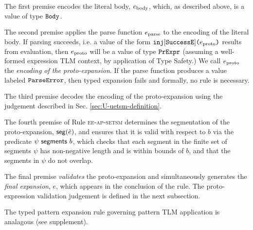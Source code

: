 \documentclass[acmsmall,review,anonymous]{acmart}\settopmatter{printfolios=true,printccs=false,printacmref=false}
\begin{document}
The first premise encodes the literal body, $e_\text{body}$, which, as described above, is a value of type $\mathtt{Body}$.

The second premise applies the parse function $e_\text{parse}$ to the encoding of the literal body. If parsing succeeds, i.e. a value of the form $\texttt{inj}[\mathtt{SuccessE}]\texttt{(}e_\text{proto}\texttt{)}$ results from evaluation, then $e_\text{proto}$ will be a value of type $\mathtt{PrExpr}$ (assuming a well-formed expression TLM context, by application of Type Safety.) We call $e_\text{proto}$ the \emph{encoding of the proto-expansion}. If the parse function produces a value labeled $\mathtt{ParseError}$, then typed expansion fails and formally, no rule is necessary.

The third premise decodes the encoding of the proto-expansion using the judgement described in Sec. \ref{sec:U-uetsm-definition}. 

The fourth premise of Rule \textsc{ee-ap-setsm} determines the segmentation of the proto-expansion, $\mathsf{seg}(\grave{e})$, and ensures that it is valid with respect to $b$ via the predicate $\psi~\mathsf{segments}~b$, which  checks that each segment in the finite set of segments $\psi$ has non-negative length and is within bounds of $b$, and that the segments in $\psi$ do not overlap.

The final premise \emph{validates} the proto-expansion and simultaneously generates the \emph{final expansion}, $e$, which appears in the conclusion of the rule. The proto-expression validation judgement is defined in the next subsection.

The typed pattern expansion rule governing pattern TLM application is analagous (see supplement).

\end{document}
